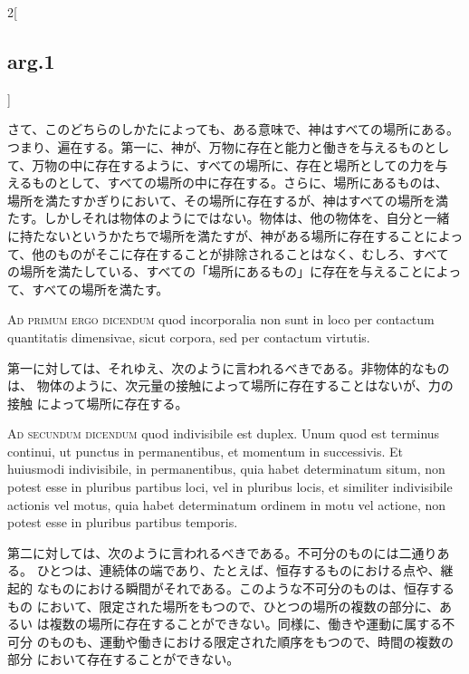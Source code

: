 \documentclass[paper=a4paper,fontsize=10pt,jafontsize=9pt,titlepage]{jlreq}
\begin{document}
\begin{paracol}{2}[\subsection{arg.1}]
\switchcolumn

さて、このどちらのしかたによっても、ある意味で、神はすべての場所にある。
 つまり、遍在する。第一に、神が、万物に存在と能力と働きを与えるものとし
 て、万物の中に存在するように、すべての場所に、存在と場所としての力を与
 えるものとして、すべての場所の中に存在する。さらに、場所にあるものは、
 場所を満たすかぎりにおいて、その場所に存在するが、神はすべての場所を満
 たす。しかしそれは物体のようにではない。物体は、他の物体を、自分と一緒
 に持たないというかたちで場所を満たすが、神がある場所に存在することによっ
 て、他のものがそこに存在することが排除されることはなく、むしろ、すべて
 の場所を満たしている、すべての「場所にあるもの」に存在を与えることによっ
 て、すべての場所を満たす。

\switchcolumn*[\subsection{ad.1}]

{\scshape Ad primum ergo dicendum} quod incorporalia non sunt in loco per
 contactum quantitatis dimensivae, sicut corpora, sed per contactum
 virtutis.

\switchcolumn

第一に対しては、それゆえ、次のように言われるべきである。非物体的なものは、
 物体のように、次元量の接触によって場所に存在することはないが、力の接触
 によって場所に存在する。

\switchcolumn*[\subsection{ad.2}]

{\scshape Ad secundum dicendum} quod indivisibile est duplex. Unum quod est
 terminus continui, ut punctus in permanentibus, et momentum in
 successivis. Et huiusmodi indivisibile, in permanentibus, quia habet
 determinatum situm, non potest esse in pluribus partibus loci, vel in
 pluribus locis, et similiter indivisibile actionis vel motus, quia
 habet determinatum ordinem in motu vel actione, non potest esse in
 pluribus partibus temporis.

\switchcolumn

第二に対しては、次のように言われるべきである。不可分のものには二通りある。
 ひとつは、連続体の端であり、たとえば、恒存するものにおける点や、継起的
 なものにおける瞬間がそれである。このような不可分のものは、恒存するもの
 において、限定された場所をもつので、ひとつの場所の複数の部分に、あるい
 は複数の場所に存在することができない。同様に、働きや運動に属する不可分
 のものも、運動や働きにおける限定された順序をもつので、時間の複数の部分
 において存在することができない。


\end{paracol}
\end{document}
